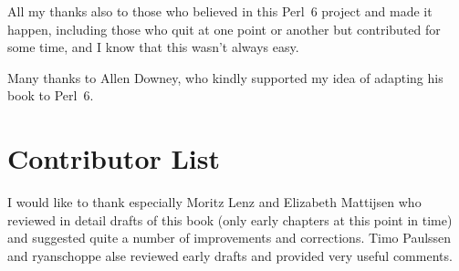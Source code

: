 All my thanks also to those who believed in 
this Perl~6 project and made it happen, including those who 
quit at one point or another but contributed for some 
time, and I know that this wasn't always easy.

Many thanks to Allen Downey, who kindly supported my idea of 
adapting his book to Perl~6.



\section*{Contributor List}

I would like to thank especially Moritz Lenz and Elizabeth 
Mattijsen who reviewed in detail drafts of this book 
(only early chapters at this point in time) and suggested 
quite a number of improvements and corrections. Timo Paulssen and 
ryanschoppe alse reviewed early drafts and provided very 
useful comments.


\clearemptydoublepage

\begin{latexonly}

\tableofcontents

\clearemptydoublepage

\end{latexonly}

